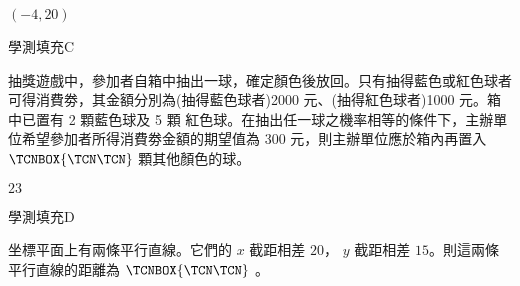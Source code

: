 \begin{QUESTIONS}
\begin{QUESTION}
\begin{QANS}
            $(-4,20)$
        \end{QANS}
        \begin{QSOLLIST}
        \end{QSOLLIST}
        \begin{QEMPTYSPACE}
        \end{QEMPTYSPACE}
    \end{QUESTION}
    \begin{QUESTION}
        \begin{ExamInfo}{98}{學測}{填充}{C}
        \end{ExamInfo}
        \begin{ExamAnsRateInfo}{60}{92}{69}{19}
        \end{ExamAnsRateInfo}
        \begin{QBODY}
            抽獎遊戲中，參加者自箱中抽出一球，確定顏色後放回。只有抽得藍色或紅色球者可得消費劵，其金額分別為(抽得藍色球者)2000 元、(抽得紅色球者)1000 元。箱中已置有 2 顆藍色球及 5 顆 紅色球。在抽出任一球之機率相等的條件下，主辦單位希望參加者所得消費劵金額的期望值為 300 元，則主辦單位應於箱內再置入 $\TCNBOX{\TCN\TCN}$ 顆其他顏色的球。
        \end{QBODY}
        \begin{QFROMS}
        \end{QFROMS}
        \begin{QTAGS}\end{QTAGS}
        \begin{QANS}
            $23$
        \end{QANS}
        \begin{QSOLLIST}
        \end{QSOLLIST}
        \begin{QEMPTYSPACE}
        \end{QEMPTYSPACE}
    \end{QUESTION}
    \begin{QUESTION}
        \begin{ExamInfo}{98}{學測}{填充}{D}
        \end{ExamInfo}
        \begin{ExamAnsRateInfo}{39}{79}{32}{6}
        \end{ExamAnsRateInfo}
        \begin{QBODY}
            坐標平面上有兩條平行直線。它們的 $x$ 截距相差 $20$， $y$ 截距相差 $15$。則這兩條平行直線的距離為 $\TCNBOX{\TCN\TCN}$ 。
        \end{QBODY}
        \begin{QFROMS}

\end{QFROMS}
\end{QUESTION}
\end{QUESTIONS}

